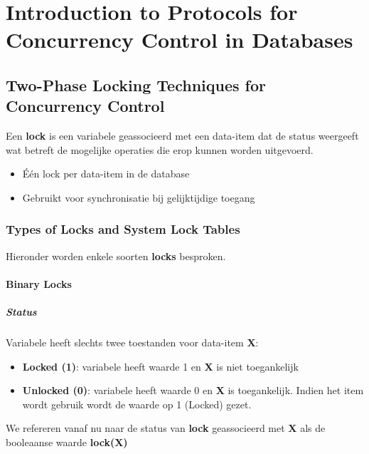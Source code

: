 \chapter{Introduction to Protocols for Concurrency Control in Databases}%
\section{Two-Phase Locking Techniques for Concurrency Control}%
Een \textbf{lock} is een variabele geassocieerd met een data-item dat de status weergeeft wat betreft de mogelijke operaties die erop kunnen worden uitgevoerd.
\begin{itemize}
	\item \'E\'en lock per data-item in de database
	\item Gebruikt voor synchronisatie bij gelijktijdige toegang
\end{itemize}


\subsection{Types of Locks and System Lock Tables}%
Hieronder worden enkele soorten \textbf{locks} besproken.

\subsubsection{Binary Locks}
\paragraph{Status}
Variabele heeft slechts twee toestanden voor data-item \textbf{X}:
\begin{itemize}
	\item \textbf{Locked (1)}: variabele heeft waarde 1 en \textbf{X} is niet toegankelijk
	\item \textbf{Unlocked (0)}: variabele heeft waarde 0 en \textbf{X} is toegankelijk. Indien het item wordt gebruik wordt de waarde op 1 (Locked) gezet.
\end{itemize}
We refereren vanaf nu naar de status van \textbf{lock} geassocieerd met \textbf{X} als de booleaanse waarde \textbf{lock(X)}

